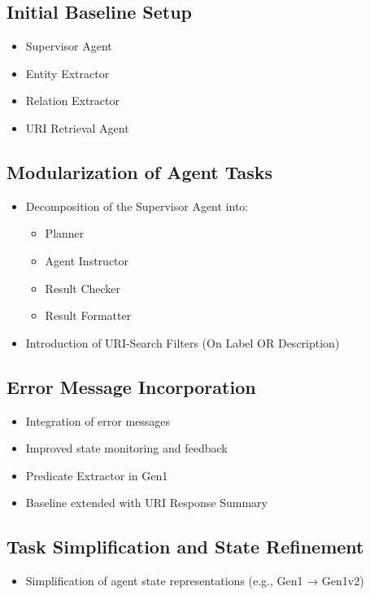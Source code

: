 \documentclass[a4paper,oneside,bibliography=totoc]{scrbook}
\begin{document}
\subsection{Initial Baseline Setup}
\label{subsec:initial_baseline_setup}
\begin{itemize}
  \item Supervisor Agent
  \item Entity Extractor
  \item Relation Extractor
  \item URI Retrieval Agent
\end{itemize}

\subsection{Modularization of Agent Tasks}
\label{subsec:modularization_agent_tasks}
\begin{itemize}
  \item Decomposition of the Supervisor Agent into:
        \begin{itemize}
          \item Planner
          \item Agent Instructor
          \item Result Checker
          \item Result Formatter
        \end{itemize}

  \item Introduction of URI-Search Filters (On Label OR Description)
\end{itemize}

\subsection{Error Message Incorporation}
\label{subsec:error_message_incorporation}
\begin{itemize}
  \item Integration of error messages
  \item Improved state monitoring and feedback
  \item Predicate Extractor in Gen1
  \item Baseline extended with URI Response Summary
\end{itemize}

\subsection{Task Simplification and State Refinement}
\label{subsec:task_simplification_state_refinement}
\begin{itemize}
  \item Simplification of agent state representations (e.g., Gen1 → Gen1v2)
\end{itemize}
\end{document}
